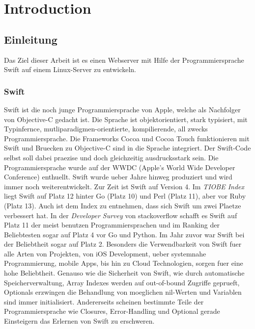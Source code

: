 ﻿%
\chapter{Introduction}\label{chap:introduction}
\chapterstart
\section{Einleitung}
\label{sec:einleitung}
Das Ziel dieser Arbeit ist es einen Webserver mit Hilfe der Programmiersprache Swift auf einem Linux-Server zu entwickeln. 

\subsection{Swift}
\label{subsection:swift}
Swift ist die noch junge Programmiersprache von Apple, welche als Nachfolger von Objective-C gedacht ist. Die Sprache ist objektorientiert, stark typisiert, mit Typinfernce, mutliparadigmen-orientierte, kompilierende, all zwecks Programmiersprache. Die Frameworks Cocoa und Cocoa Touch funktionieren mit Swift und Bruecken zu Objective-C sind in die Sprache integriert. Der Swift-Code selbst soll dabei praezise und doch gleichzeitig ausdrucksstark sein\parencite{appleswift}.  Die Programmiersprache wurde auf der WWDC (Apple's World Wide Developer Conference)\parencite{swiftannounced} enthuellt. Swift wurde ueber Jahre hinweg produziert und wird immer noch weiterentwickelt. Zur Zeit ist Swift auf Version 4\parencite{ swift4}. Im \textit{TIOBE Index}\parencite{tiobe} liegt Swift auf Platz 12 hinter Go (Platz 10) und Perl (Platz 11), aber vor Ruby (Platz 13). Auch ist dem Index zu entnehmen, dass sich Swift um zwei Plaetze verbessert hat. In der \textit{Developer Survey} von stackoverflow schafft es Swift auf Platz 11 der meist benutzen Programmiersprachen und im Ranking der Beliebtesten sogar auf Platz 4 vor Go und Python\parencite{survey2017}. Im Jahr zuvor war Swift bei der Beliebtheit sogar auf Platz 2\parencite{survey2016}. Besonders die Verwendbarkeit von Swift fuer alle Arten von Projekten, von iOS Development, ueber systemnahe Programmierung, mobile Apps, bis hin zu Cloud Technologien, sorgen fuer eine hohe Beliebtheit. Genauso wie die Sicherheit von Swift, wie durch automatische Speicherverwaltung, Array Indexes werden auf out-of-bound Zugriffe geprueft, Optionals erzwingen die Behandlung von moeglichen nil-Werten und Variablen sind immer initialisiert. Andererseits scheinen bestimmte Teile der Programmiersprache wie Closures, Error-Handling und Optional gerade Einsteigern das Erlernen von Swift zu erschweren\parencite{studyonswift}.


